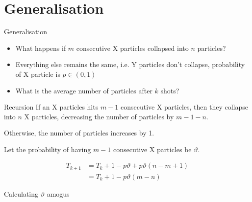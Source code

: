 \documentclass[xcolor={usenames,dvipsnames}]{beamer}
\begin{document}
\section{Generalisation}
\begin{frame}{Generalisation}
  \begin{itemize}
    \item What happens if $m$ consecutive X particles collapsed into $n$ particles?
    \item Everything else remains the same, i.e. Y particles don't collapse, probability of X particle is $p \in (0, 1)$
    \item What is the average number of particles after $k$ shots?
  \end{itemize}
\end{frame}

\begin{frame}{Recursion}
  If an X particles hits $m-1$ consecutive X particles, then they collapse into $n$ X particles, decreasing the number of particles by $m-1-n$.

  Otherwise, the number of particles increases by 1.

  Let the probability of having  $m-1$ consecutive X particles be $\vartheta$. 

  \begin{align*}
    T_{k+1} &= T_k + 1-p\vartheta + p\vartheta(n-m+1) \\
            &= T_k + 1 - p\vartheta(m - n)
  \end{align*}
\end{frame}
\begin{frame}{Calculating $\vartheta$}
  amogus
\end{frame}
\end{document}
